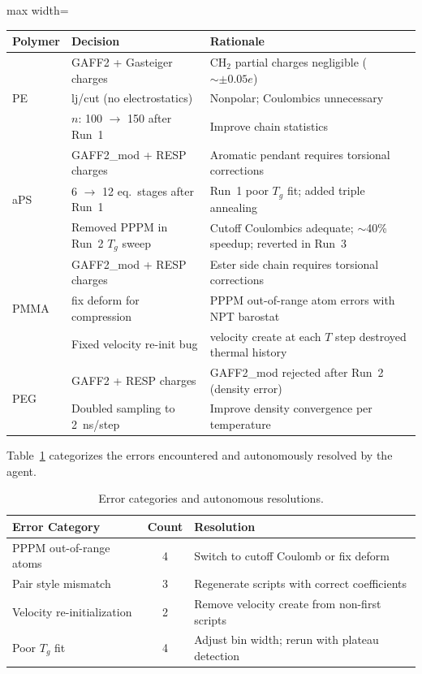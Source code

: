 \documentclass[journal=acsami,manuscript=suppinfo]{achemso}
\begin{document}
\begin{adjustbox}{max width=\textwidth}
\begin{tabular}{lll}
\toprule
\textbf{Polymer} & \textbf{Decision} & \textbf{Rationale} \\
\midrule
\multirow{3}{*}{PE}
& GAFF2 + Gasteiger charges & CH$_2$ partial charges negligible ($\sim\pm 0.05e$) \\
& lj/cut (no electrostatics) & Nonpolar; Coulombics unnecessary \\
& $n$: 100 $\to$ 150 after Run~1 & Improve chain statistics \\
\midrule
\multirow{3}{*}{aPS}
& GAFF2\_mod + RESP charges & Aromatic pendant requires torsional corrections \\
& 6 $\to$ 12 eq.\ stages after Run~1 & Run~1 poor $T_g$ fit; added triple annealing \\
& Removed PPPM in Run~2 $T_g$ sweep & Cutoff Coulombics adequate; $\sim$40\% speedup; reverted in Run~3 \\
\midrule
\multirow{3}{*}{PMMA}
& GAFF2\_mod + RESP charges & Ester side chain requires torsional corrections \\
& fix deform for compression & PPPM out-of-range atom errors with NPT barostat \\
& Fixed velocity re-init bug & velocity create at each $T$ step destroyed thermal history \\
\midrule
\multirow{2}{*}{PEG}
& GAFF2 + RESP charges & GAFF2\_mod rejected after Run~2 (density error) \\
& Doubled sampling to 2~ns/step & Improve density convergence per temperature \\
\bottomrule
\end{tabular}
\end{adjustbox}
\label{tab:si_decisions}

Table~\ref{tab:si_errors} categorizes the errors encountered and autonomously resolved by the agent.

\begin{table}[H]
\centering
\caption{Error categories and autonomous resolutions.}
\label{tab:si_errors}
\small
\begin{tabular}{lcl}
\toprule
\textbf{Error Category} & \textbf{Count} & \textbf{Resolution} \\
\midrule
PPPM out-of-range atoms & 4 & Switch to cutoff Coulomb or fix deform \\
Pair style mismatch & 3 & Regenerate scripts with correct coefficients \\
Velocity re-initialization & 2 & Remove velocity create from non-first scripts \\
Poor $T_g$ fit & 4 & Adjust bin width; rerun with plateau detection \\
\bottomrule
\end{tabular}
\end{table}
\end{document}
